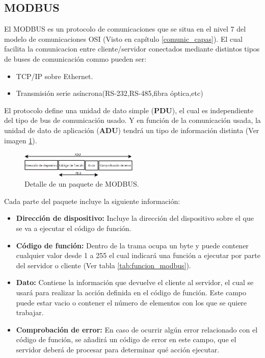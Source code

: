 \subsection{MODBUS}
\label{comunic_modbus}
El MODBUS es un protocolo de comunicaciones que se situa en el nivel 7 del modelo de comunicaciones OSI (Visto en capítulo \ref{comunic_capas}). El cual facilita la comunicacion entre cliente/servidor conectados mediante distintos tipos de buses de comunicación commo pueden ser:

\begin{itemize}
    \item TCP/IP sobre Ethernet.
    \item Transmisión serie asíncrona(RS-232,RS-485,fibra óptica,etc)
\end{itemize}

El protocolo define una unidad de dato simple (\textbf{PDU}), el cual es independiente del tipo de bus de comunicación usado. Y en función de la comunicación usada, la unidad de dato de aplicación (\textbf{ADU}) tendrá un tipo de información distinta (Ver imagen \ref{fig:paquete_modbus}).
    \begin{figure}[H]
            \centering
            \includegraphics[width=0.5\textwidth]{images/trama_modbus.png}
            \caption{Detalle de un paquete de MODBUS.}
            \label{fig:paquete_modbus}
    \end{figure}
Cada parte del paquete incluye la siguiente información:
\begin{itemize}
    \item \textbf{Dirección de dispositivo:} Incluye la dirección del dispositivo sobre el que se va a ejecutar el código de función.
    \item \textbf{Código de función:} Dentro de la trama ocupa un byte y puede contener cualquier valor desde 1 a 255 el cual indicará una función a ejecutar por parte del servidor o cliente (Ver tabla \ref{tab:funcion_modbus}).
    \item \textbf{Dato:} Contiene la información que devuelve el cliente al servidor, el cual se usará para realizar la acción definida en el código de función. Este campo puede estar vacio o contener el número de elementos con los que se quiere trabajar.
    \item \textbf{Comprobación de error:} En caso de ocurrir algún error relacionado con el código de función, se añadirá un código de error en este campo, que el servidor deberá de procesar para determinar qué acción ejecutar.
\end{itemize}
